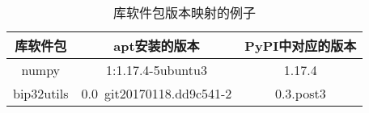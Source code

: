 \begin{table}
	\centering
	\begin{threeparttable}
		\caption{库软件包版本映射的例子}
		\label{tab:version}
		\begin{tabularx}{0.66\textwidth}{ccc}
			\toprule
			\textbf{库软件包}&\textbf{apt安装的版本}&\textbf{PyPI中对应的版本}\\
			\midrule
			numpy&1:1.17.4-5ubuntu3&1.17.4\\
			bip32utils&0.0~git20170118.dd9c541-2&0.3.post3\\
			\bottomrule
		\end{tabularx}
	\end{threeparttable}
\end{table}